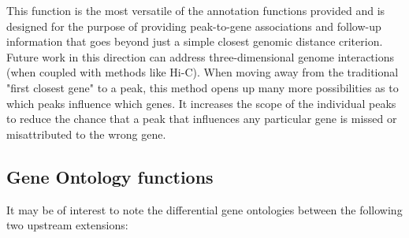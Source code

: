 \documentclass[12pt]{article}
\begin{document}
This function is the most versatile of the annotation functions provided and is designed for the purpose of providing peak-to-gene associations and follow-up information that goes beyond just a simple closest genomic distance criterion.  Future work in this direction can address three-dimensional genome interactions (when coupled with methods like Hi-C).  When moving away from the traditional "first closest gene" to a peak, this method opens up many more possibilities as to which peaks influence which genes. It increases the scope of the individual peaks to reduce the chance that a peak that influences any particular gene is missed or misattributed to the wrong gene.

\subsection{Gene Ontology functions} \label{sec:GO}

It may be of interest to note the differential gene ontologies between the following two upstream extensions:
\end{document}
